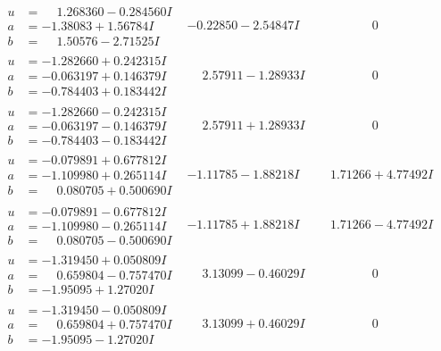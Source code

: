 \documentclass[1p]{elsarticle_modified}
\theoremstyle{definition}
\begin{document}
$$\begin{array}{c|c|c}
\begin{aligned}
u &= \phantom{-}1.268360 - 0.284560 I \\
a &= -1.38083 + 1.56784 I \\
b &= \phantom{-}1.50576 - 2.71525 I\end{aligned}
 & -0.22850 - 2.54847 I & \phantom{-0.000000 } 0 \\ \hline\begin{aligned}
u &= -1.282660 + 0.242315 I \\
a &= -0.063197 + 0.146379 I \\
b &= -0.784403 + 0.183442 I\end{aligned}
 & \phantom{-}2.57911 - 1.28933 I & \phantom{-0.000000 } 0 \\ \hline\begin{aligned}
u &= -1.282660 - 0.242315 I \\
a &= -0.063197 - 0.146379 I \\
b &= -0.784403 - 0.183442 I\end{aligned}
 & \phantom{-}2.57911 + 1.28933 I & \phantom{-0.000000 } 0 \\ \hline\begin{aligned}
u &= -0.079891 + 0.677812 I \\
a &= -1.109980 + 0.265114 I \\
b &= \phantom{-}0.080705 + 0.500690 I\end{aligned}
 & -1.11785 - 1.88218 I & \phantom{-}1.71266 + 4.77492 I \\ \hline\begin{aligned}
u &= -0.079891 - 0.677812 I \\
a &= -1.109980 - 0.265114 I \\
b &= \phantom{-}0.080705 - 0.500690 I\end{aligned}
 & -1.11785 + 1.88218 I & \phantom{-}1.71266 - 4.77492 I \\ \hline\begin{aligned}
u &= -1.319450 + 0.050809 I \\
a &= \phantom{-}0.659804 - 0.757470 I \\
b &= -1.95095 + 1.27020 I\end{aligned}
 & \phantom{-}3.13099 - 0.46029 I & \phantom{-0.000000 } 0 \\ \hline\begin{aligned}
u &= -1.319450 - 0.050809 I \\
a &= \phantom{-}0.659804 + 0.757470 I \\
b &= -1.95095 - 1.27020 I\end{aligned}
 & \phantom{-}3.13099 + 0.46029 I & \phantom{-0.000000 } 0 \\ \hline\begin{aligned}

\end{aligned}
\end{array}$$
\end{document}
